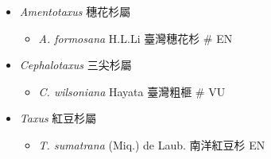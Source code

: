 
  \begin{itemize}
 \item[] \textit{Amentotaxus} 穗花杉屬
                            
  \begin{itemize}
        \item[] \textit{A. formosana} H.L.Li  臺灣穗花杉  \# EN
  \end{itemize}
 \item[] \textit{Cephalotaxus} 三尖杉屬
                            
  \begin{itemize}
        \item[] \textit{C. wilsoniana} Hayata  臺灣粗榧  \# VU
  \end{itemize}
 \item[] \textit{Taxus} 紅豆杉屬
                            
  \begin{itemize}
        \item[] \textit{T. sumatrana} (Miq.) de Laub.  南洋紅豆杉   EN
  \end{itemize}
  \end{itemize}
